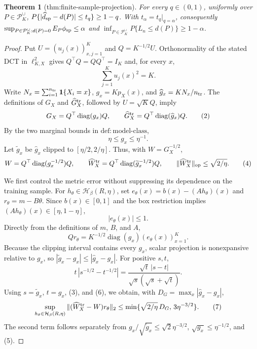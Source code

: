 \documentclass{article}
\newtheorem{theorem}{Theorem}
\begin{document}
\begin{theorem}[thm:finite-sample-projection]\label{thm:finite-sample-projection}
For every \(q\in(0,1)\), uniformly over \(P\in\mathcal P_K^{\cup}\), \(P\{|\widehat d_{\rm sp}-d(P)|\le t_q\}\ge1-q\). With \(t_\alpha=t_q\vert_{q=\alpha}\), consequently \(\sup_{P\in\mathcal P_K^{\cup}:d(P)=0}E_P\phi_{\rm sp}\le\alpha\) and \(\inf_{P\in\mathcal P_K^{\cup}}P\{L_n\le d(P)\}\ge1-\alpha\).
\end{theorem}
\begin{proof}
Put \(U=(u_j(x))_{x,j=1}^K\) and \(Q=K^{-1/2}U\).  Orthonormality of the stated DCT in \(\ell^2_{K,X}\) gives \(Q^\top Q=Q Q^\top=I_K\) and, for every \(x\),
\[
 \sum_{j=1}^K u_j(x)^2=K. \tag{1}
\]
Write \(N_x=\sum_{i=1}^{n_{\rm tr}}\mathbf 1\{X_i=x\}\), \(g_x=Kp_X(x)\), and \(\widehat g_x=KN_x/n_{\rm tr}\).  The definitions of \(G_X\) and \(\widehat G_X^{\rm tr}\), followed by \(U=\sqrt KQ\), imply
\[
 G_X=Q^\top\operatorname{diag}(g_x)Q,
 \qquad
 \widehat G_X^{\rm tr}=Q^\top\operatorname{diag}(\widehat g_x)Q. \tag{2}
\]
By the two marginal bounds in \(\mathrm{def:model\mbox{-}class}\),
\[
 \eta\le g_x\le \eta^{-1}. \tag{3}
\]
Let \(\widetilde g_x\) be \(\widehat g_x\) clipped to \([\eta/2,2/\eta]\).  Thus, with \(W=G_X^{-1/2}\),
\[
 W=Q^\top\operatorname{diag}(g_x^{-1/2})Q,
 \qquad
 \widehat W_X^{\rm tr}=Q^\top\operatorname{diag}(\widetilde g_x^{-1/2})Q,
 \qquad
 \|\widehat W_X^{\rm tr}\|_{\rm op}\le \sqrt{2/\eta}. \tag{4}
\]

We first control the metric error without suppressing its dependence on the training sample.  For \(h_\theta\in\mathcal H_\beta(R,\eta)\), set \(e_\theta(x)=b(x)-(Ah_\theta)(x)\) and \(r_\theta=m-B\theta\).  Since \(b(x)\in[0,1]\) and the box restriction implies \((Ah_\theta)(x)\in[\eta,1-\eta]\),
\[
 |e_\theta(x)|\le1. \tag{5}
\]
Directly from the definitions of \(m\), \(B\), and \(A\),
\[
 Qr_\theta=K^{-1/2}\operatorname{diag}(g_x)(e_\theta(x))_{x=1}^K. \tag{6}
\]
Because the clipping interval contains every \(g_x\), scalar projection is nonexpansive relative to \(g_x\), so \(|\widetilde g_x-g_x|\le|\widehat g_x-g_x|\).  For positive \(s,t\),
\[
 t\,|s^{-1/2}-t^{-1/2}|
 =\frac{\sqrt t\,|s-t|}{\sqrt s(\sqrt s+\sqrt t)}.
\]
Using \(s=\widetilde g_x\), \(t=g_x\), (3), and (6), we obtain, with \(D_G=\max_x|\widehat g_x-g_x|\),
\[
 \sup_{h_\theta\in\mathcal H_\beta(R,\eta)}
 \|(\widehat W_X^{\rm tr}-W)r_\theta\|_2
 \le \min\{\sqrt{2/\eta}\,D_G,\,3\eta^{-3/2}\}. \tag{7}
\]
The second term follows separately from \(g_x/\sqrt{\widetilde g_x}\le\sqrt2\eta^{-3/2}\), \(\sqrt{g_x}\le\eta^{-1/2}\), and (5).


\end{proof}
\end{document}
